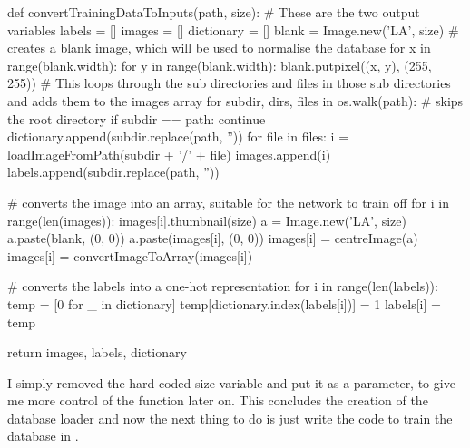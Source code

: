 \documentclass{report}
\begin{document}
\begin{python}
def convertTrainingDataToInputs(path, size):
    # These are the two output variables
    labels = []
    images = []
    dictionary = []
    blank = Image.new('LA', size)  # creates a blank image, which will be used to normalise the database
    for x in range(blank.width):
        for y in range(blank.width):
            blank.putpixel((x, y), (255, 255))
    # This loops through the sub directories and files in those sub directories and adds them to the images array
    for subdir, dirs, files in os.walk(path):
        # skips the root directory
        if subdir == path:
            continue
        dictionary.append(subdir.replace(path, ''))
        for file in files:
            i = loadImageFromPath(subdir + '/' + file)
            images.append(i)
            labels.append(subdir.replace(path, ''))

    # converts the image into an array, suitable for the network to train off
    for i in range(len(images)):
        images[i].thumbnail(size)
        a = Image.new('LA', size)
        a.paste(blank, (0, 0))
        a.paste(images[i], (0, 0))
        images[i] = centreImage(a)
        images[i] = convertImageToArray(images[i])

    # converts the labels into a one-hot representation
    for i in range(len(labels)):
        temp = [0 for _ in dictionary]
        temp[dictionary.index(labels[i])] = 1
        labels[i] = temp

    return images, labels, dictionary
\end{python}
I simply removed the hard-coded size variable and put it as a parameter, to give me more control of the function later on.
\newline
This concludes the creation of the database loader and now the next thing to do is just write the code to train the database in .
\end{document}
